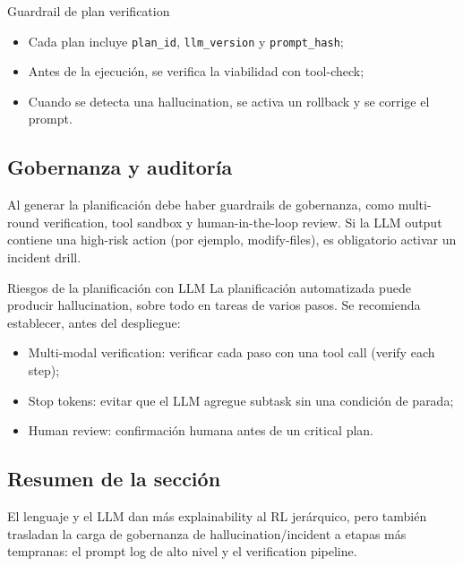 \begin{warningbox}{Guardrail de plan verification}
\begin{itemize}
    \item Cada plan incluye \texttt{plan\_id}, \texttt{llm\_version} y \texttt{prompt\_hash};
    \item Antes de la ejecución, se verifica la viabilidad con tool-check;
    \item Cuando se detecta una hallucination, se activa un rollback y se corrige el prompt.
\end{itemize}
\end{warningbox}

\subsection{Gobernanza y auditoría}

Al generar la planificación debe haber guardrails de gobernanza, como multi-round verification, tool sandbox y human-in-the-loop review. Si la LLM output contiene una high-risk action (por ejemplo, modify-files), es obligatorio activar un incident drill.

\begin{warningbox}{Riesgos de la planificación con LLM}
La planificación automatizada puede producir hallucination, sobre todo en tareas de varios pasos. Se recomienda establecer, antes del despliegue:
\begin{itemize}
    \item Multi-modal verification: verificar cada paso con una tool call (verify each step);
    \item Stop tokens: evitar que el LLM agregue subtask sin una condición de parada;
    \item Human review: confirmación humana antes de un critical plan.
\end{itemize}
\end{warningbox}

\subsection{Resumen de la sección}

El lenguaje y el LLM dan más explainability al RL jerárquico, pero también trasladan la carga de gobernanza de hallucination/incident a etapas más tempranas: el prompt log de alto nivel y el verification pipeline.
